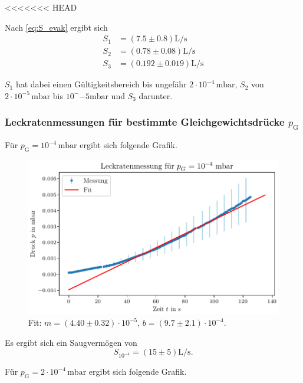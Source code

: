 <<<<<<< HEAD

Nach \eqref{eq:S_evak} ergibt sich
\begin{align}
    S_1 &= (\num{7.5} \pm \num{0.8}) \si{\liter\per\second} \\
    S_2 &= (\num{0.78} \pm \num{0.08}) \si{\liter\per\second} \\
    S_3 &= (\num{0.192} \pm \num{0.019}) \si{\liter\per\second} 
\end{align}

$S_1$ hat dabei einen Gültigkeitsbereich bis ungefähr $\num{2}\cdot 10^{-4} \, \si{\milli\bar}$, $S_2$ von $\num{2}\cdot 10^{-5} \, \si{\milli\bar}$ bis $10^-{-5} \si{\milli\bar}$ und $S_3$ darunter.

\subsubsection{Leckratenmessungen für bestimmte Gleichgewichtsdrücke $p_\text{G}$}

Für $p_\text{G} = 10^{-4} \, \si{\milli\bar}$ ergibt sich folgende Grafik.

\begin{figure}[H]
    \centering
    \includegraphics[width=\textwidth]{plots/TP_Leck_1e4.pdf}
    \caption{Fit: $m = (\num{4.40} \pm \num{0.32}) \cdot 10^{-5}$, $b = (\num{9.7} \pm \num{2.1}) \cdot 10^{-4}$.}
    \label{fig:TP_Leck_1e4}
\end{figure}

Es ergibt sich ein Saugvermögen von
\begin{equation}
    S_{10^{-4}} = (\num{15} \pm \num{5}) \si{\liter\per\second}.
\end{equation}

Für $p_\text{G} = 2 \cdot 10^{-4} \, \si{\milli\bar}$ ergibt sich folgende Grafik.

